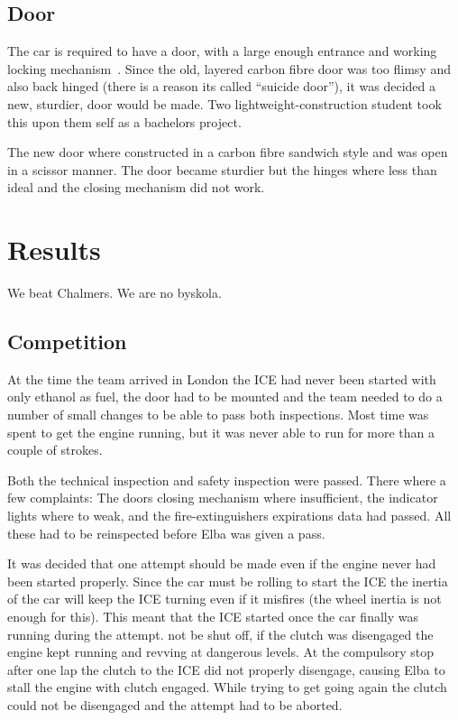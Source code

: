 \subsection{Door}
The car is required to have a door, with a large enough entrance and working
locking mechanism~\cite{semrules16c1}. Since the old, layered carbon fibre door
was too flimsy and also back hinged (there is a reason its called ``suicide door''),
it was decided a new, sturdier, door would be made. Two lightweight-construction
student took this upon them self as a bachelors project. 

The new door where constructed in a carbon fibre sandwich style and was open in
a scissor manner. The door became sturdier but the hinges where less than ideal
and the closing mechanism did not work.

\section{Results}
We beat Chalmers. We are no byskola.

\subsection{Competition}
At the time the team arrived in London the ICE had never been started with only
ethanol as fuel, the door had to be mounted and the team needed to do a number
of small changes to be able to pass both inspections. Most time was spent to get
the engine running, but it was never able to run for more than a couple of
strokes. 

Both the technical inspection and safety inspection were passed. There where a
few complaints: The doors closing mechanism where insufficient, the indicator
lights where to weak, and the fire-extinguishers expirations data had passed.
All these had to be reinspected before Elba was given a pass.

It was decided that one attempt should be made even if the engine never had been
started properly. Since the car must be rolling to start the ICE the inertia of
the car will keep the ICE turning even if it misfires (the wheel inertia is not
enough for this). This meant that the ICE started once the car finally was
running during the attempt. %
not be shut off, if the clutch was disengaged the engine kept running and
revving at dangerous levels. %
At the compulsory stop after one lap the clutch to the ICE did not properly
disengage, causing Elba to stall the engine with clutch engaged. While trying to
get going again the clutch could not be disengaged and the attempt had to be
aborted.

